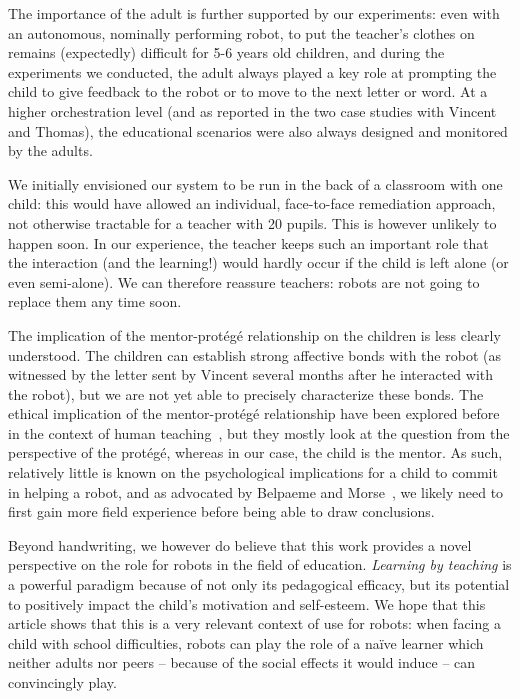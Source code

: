 \documentclass{article}
\begin{document}
The importance of the adult is further supported by our experiments: even with
an autonomous, nominally performing robot, to put the teacher's clothes on
remains (expectedly) difficult for 5-6 years old children, and during the
experiments we conducted, the adult always played a key role at prompting the
child to give feedback to the robot or to move to the next letter or word.  At a
higher orchestration level (and as reported in the two case studies with Vincent
and Thomas), the educational scenarios were also always designed and monitored
by the adults.

We initially envisioned our system to be run in the back of a classroom with one
child: this would have allowed an individual, face-to-face remediation approach,
not otherwise tractable for a teacher with 20 pupils.  This is however unlikely
to happen soon. In our experience, the teacher keeps such an important role that
the interaction (and the learning!) would hardly occur if the child is left
alone (or even semi-alone). We can therefore reassure teachers: robots are not
going to replace them any time soon.

The implication of the mentor-protégé relationship on the children is less
clearly understood. The children can establish strong affective bonds with the robot (as
witnessed by the letter sent by Vincent several months after he interacted with
the robot), but we are not yet able to precisely characterize these bonds. The
ethical implication of the mentor-protégé relationship have been explored before
in the context of human teaching~\cite{brad1999mentor,wendelyn2008context}, but
they mostly look at the question from the perspective of the protégé, whereas in our
case, the child is the mentor. As such, relatively little is known on the
psychological implications for a child to commit in helping a robot, and as
advocated by Belpaeme and Morse~\cite{belpaeme2010time}, we likely need to first
gain more field experience before being able to draw conclusions.

Beyond handwriting, we however do believe that this work provides a novel
perspective on the role for robots in the field of education. \emph{Learning by
teaching} is a powerful paradigm because of not only its pedagogical efficacy,
but its potential to positively impact the child's motivation and self-esteem.
We hope that this article shows that this is a very relevant context of use for
robots: when facing a child with school difficulties, robots can play the role
of a naïve learner which neither adults nor peers -- because of the social
effects it would induce -- can convincingly play.
\end{document}
